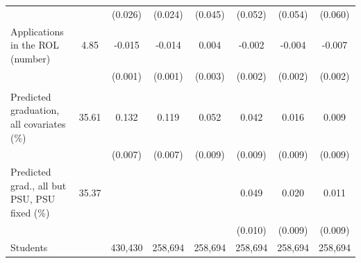 \begin{tabular}{lc*{6}{c}}
 &  & (0.026) & (0.024) & (0.045) & (0.052) & (0.054) & (0.060) \\
Applications in the ROL (number) &   4.85 & -0.015\sym{***} & -0.014\sym{***} &  0.004 & -0.002 & -0.004\sym{*} & -0.007\sym{***} \\
 &  & (0.001) & (0.001) & (0.003) & (0.002) & (0.002) & (0.002) \\
\addlinespace
\multicolumn{8}{l}{\textit{Joint tests}} \\
Predicted graduation, all covariates (\%) &  35.61 &  0.132\sym{***} &  0.119\sym{***} &  0.052\sym{***} &  0.042\sym{***} &  0.016\sym{*} &  0.009 \\
 &  & (0.007) & (0.007) & (0.009) & (0.009) & (0.009) & (0.009) \\
Predicted grad., all but PSU, PSU fixed (\%) &  35.37 &  &  &  &  0.049\sym{***} &  0.020\sym{**} &  0.011 \\
 &  &  &  &  & (0.010) & (0.009) & (0.009) \\
\midrule
Students & &   430,430 &   258,694 &   258,694 &   258,694 &   258,694 &   258,694 \\
\bottomrule
\end{tabular}
